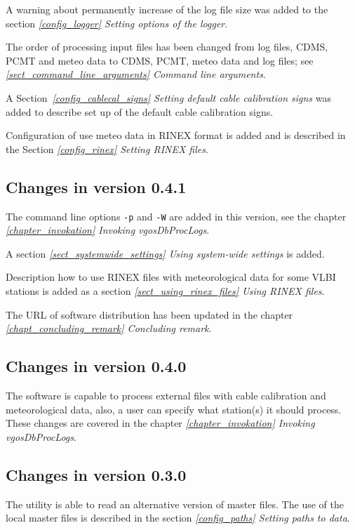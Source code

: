 \documentclass [10pt,letterpaper]{report}
\begin{document}
A warning about permanently increase of the log file size was added to the section
\emph{\ref{config_logger} Setting options of the logger}.

The order of processing input files has been changed from log files,
CDMS, PCMT and meteo data to CDMS, PCMT, meteo data and log files;
see \emph{\ref{sect_command_line_arguments} Command line arguments}.

A Section~\emph{\ref{config_cablecal_signs} Setting default cable calibration signs}
was added to describe set up of the default cable calibration signs.

Configuration of use meteo data in RINEX format is added and is described in the
Section \emph{\ref{config_rinex} Setting RINEX files}.


\subsection{Changes in version 0.4.1}
The command line options {\tt -p} and {\tt -W} are added in this version, see
the chapter \emph{\ref{chapter_invokation} Invoking vgosDbProcLogs}.

A section \emph{\ref{sect_systemwide_settings} Using system-wide settings} is added.

Description how to use RINEX files with meteorological data for some VLBI
stations is added as a section \emph{\ref{sect_using_rinex_files} Using RINEX files}.

The URL of software distribution has been updated in the chapter
\emph{\ref{chapt_concluding_remark} Concluding remark}.



\subsection{Changes in version 0.4.0}
The software is capable to process external files with cable calibration
and meteorological data, also, a user can specify what station(s) it
should process. These changes are covered in the
chapter \emph{\ref{chapter_invokation} Invoking vgosDbProcLogs}.


\subsection{Changes in version 0.3.0}
The utility is able to read an alternative version of master files. The
use of the local master files is described in the section
\emph{\ref{config_paths} Setting paths to data}.
\end{document}
